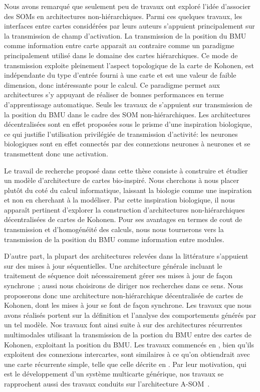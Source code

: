 \documentclass[../main]{subfiles}
\begin{document}
Nous avons remarqué que seulement peu de travaux ont exploré l'idée d'associer des SOMs en architectures non-hiérarchiques.
Parmi ces quelques travaux, les interfaces entre cartes considérées par leurs auteurs s'appuient principalement sur la transmission de champ d'activation.
La transmission de la position du BMU comme information entre carte apparait au contraire comme un paradigme principalement utilisé dans le domaine des cartes hiérarchiques. Ce mode de transmission exploite pleinement l'aspect topologique de la carte de Kohonen, est indépendante du type d'entrée fourni à une carte et est une valeur de faible dimension, donc intéressante pour le calcul. Ce paradigme permet aux architectures s'y appuyant de réaliser de bonnes performances en terme d'apprentissage automatique.
Seuls les travaux de \cite{dominey13} s'appuient sur transmission de la position du BMU dans le cadre des SOM non-hiérarchiques.
Les architectures décentralisées sont en effet proposées sous le prisme d'une inspiration biologique, ce qui justifie l'utilisation privilégiée de transmission d'activité: les neurones biologiques sont en effet connectés par des connexions neurones à neurones et se transmettent donc une activation. 

Le travail de recherche proposé dans cette thèse consiste à construire et étudier un modèle d'architecture de cartes bio-inspiré.
Nous cherchons  à nous placer plutôt du coté du calcul informatique, laissant la biologie comme une inspiration et non en cherchant à la modéliser. 
Par cette inspiration biologique, il nous apparaît pertinent d'explorer la construction d'architectures non-hiérarchiques décentralisées de cartes de Kohonen. Pour ses avantages en termes de cout de transmission et d'homogénéité des calculs, nous nous tournerons vers la transmission de la position du BMU comme information entre modules.

D'autre part, la plupart des architectures relevées dans la littérature s'appuient sur des mises à jour séquentielles. 
Une architecture générale incluant le traitement de séquence doit nécessairement gérer ses mises à jour de façon synchrone~; aussi nous choisirons de diriger nos recherches dans ce sens.
Nous proposerons donc une architecture non-hiérarchique décentralisée de cartes de Kohonen, dont les mises à jour se font de façon synchrone. Les travaux que nous avons réalisés portent sur la définition et l'analyse des comportements générés par un tel modèle.
Nos travaux font ainsi suite à \cite{baheux_towards_2014} sur des architectures récurrentes multimodales utilisant la transmission de la postion du BMU entre des cartes de Kohonen, exploitant la position du BMU.
Les travaux commencés en \cite{baheux_towards_2014}, bien qu'ils exploitent des connexions intercartes, sont similaires à ce qu'on obtiendrait avec une carte récurrente simple, telle que celle décrite en \cite{fix20}.
Par leur motivation, qui est le développement d'un système multicarte générique, nos travaux se rapprochent aussi des travaux conduits sur l'architecture A-SOM~\cite{johnsson_associating_2008, johnsson_associative_2009,gil_sarasom_2015, Buonamente2015DiscriminatingAS}.
\end{document}
